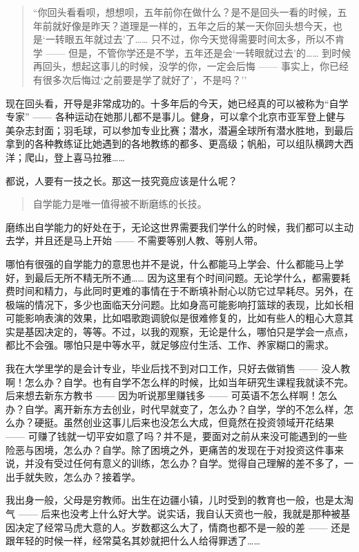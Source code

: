\documentclass[11pt]{article}
\begin{document}
\begin{quote}
``你回头看看呗，想想呗，五年前你在做什么？是不是回头一看的时候，五年前就好像是昨天？道理是一样的，五年之后的某一天你回头想今天，也是`一转眼五年就过去'了\ldots{}\ldots{}
只不过，你今天觉得需要时间太多，所以不肯学 ------
但是，不管你学还是不学，五年还是会`一转眼就过去'的\ldots{}\ldots{}
到时候再回头，想起这事儿的时候，没学的你，一定会后悔 ------
事实上，你已经有很多次后悔过`之前要是学了就好了'，不是吗？''
\end{quote}

现在回头看，开导是非常成功的。十多年后的今天，她已经真的可以被称为``自学专家''
------
各种运动在她那儿都不是事儿。健身，可以拿个北京市亚军登上健与美杂志封面；羽毛球，可以参加专业比赛；潜水，潜遍全球所有潜水胜地，到最后拿到的各种教练证比她遇到的各地教练的都多、更高级；帆船，可以组队横跨大西洋；爬山，登上喜马拉雅\ldots{}\ldots{}

    都说，人要有一技之长。那这一技究竟应该是什么呢？

\begin{quote}
自学能力是唯一值得被不断磨练的长技。
\end{quote}

磨练出自学能力的好处在于，无论这世界需要我们学什么的时候，我们都可以主动去学，并且还是马上开始
------ 不需要等别人教、等别人带。

哪怕有很强的自学能力的意思也并不是说，什么都能马上学会、什么都能马上学好，到最后无所不精无所不通\ldots{}\ldots{}
因为这里有个时间问题。无论学什么，都需要耗费时间和精力，与此同时更难的事情在于不断填补耐心以防它过早耗尽。另外，在极端的情况下，多少也面临天分问题。比如身高可能影响打篮球的表现，比如长相可能影响表演的效果，比如唱歌跑调貌似是很难修复的，比如有些人的粗心大意其实是基因决定的，等等。不过，以我的观察，无论是什么，哪怕只是学会一点点，都比不会强。哪怕只是中等水平，就足够应付生活、工作、养家糊口的需求。

我在大学里学的是会计专业，毕业后找不到对口工作，只好去做销售 ------
没人教啊！怎么办？自学。也有自学不怎么样的时候，比如当年研究生课程我就读不完。后来想去新东方教书
------ 因为听说那里赚钱多 ------
可英语不怎么样啊！怎么办？自学。离开新东方去创业，时代早就变了，怎么办？自学，学的不怎么样，怎么办？硬挺。虽然创业这事儿后来也没怎么大成，但竟然在投资领域开花结果
------
可赚了钱就一切平安如意了吗？并不是，要面对之前从来没可能遇到的一些险恶与困境，怎么办？自学。除了困境之外，更痛苦的发现在于对投资这件事来说，并没有受过任何有意义的训练，怎么办？自学。觉得自己理解的差不多了，一出手就失败，怎么办？接着学。

我出身一般，父母是穷教师。出生在边疆小镇，儿时受到的教育也一般，也是太淘气
------
后来也没考上什么好大学。说实话，我自认天资也一般，我就是那种被基因决定了经常马虎大意的人。岁数都这么大了，情商也都不是一般的差
------
还是跟年轻的时候一样，经常莫名其妙就把什么人给得罪透了\ldots{}\ldots{}
\end{document}
